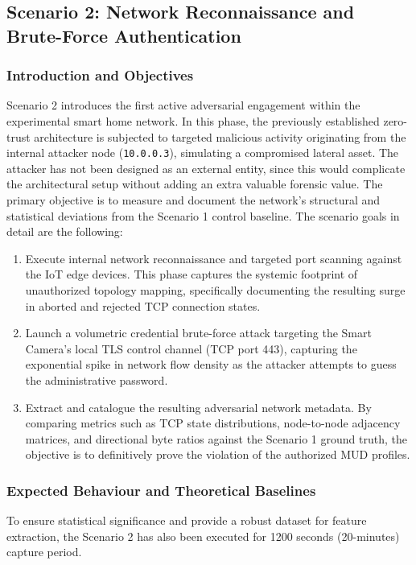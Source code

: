 \subsection{Scenario 2: Network Reconnaissance and Brute-Force Authentication}
\subsubsection{Introduction and Objectives}
Scenario 2 introduces the first active adversarial engagement within the experimental smart home network. In this phase, the previously established zero-trust architecture is subjected to targeted malicious activity originating from the internal attacker node (\texttt{10.0.0.3}), simulating a compromised lateral asset. The attacker has not been designed as an external entity, since this would complicate the architectural setup without adding an extra valuable forensic value. The primary objective is to measure and document the network's structural and statistical deviations from the Scenario 1 control baseline. The scenario goals in detail are the following:

\begin{enumerate}
	\item Execute internal network reconnaissance and targeted port scanning against the IoT edge devices. This phase captures the systemic footprint of unauthorized topology mapping, specifically documenting the resulting surge in aborted and rejected TCP connection states.
	\item Launch a volumetric credential brute-force attack targeting the Smart Camera's local TLS control channel (TCP port 443), capturing the exponential spike in network flow density as the attacker attempts to guess the administrative password.
	\item Extract and catalogue the resulting adversarial network metadata. By comparing metrics such as TCP state distributions, node-to-node adjacency matrices, and directional byte ratios against the Scenario 1 ground truth, the objective is to definitively prove the violation of the authorized MUD profiles.
\end{enumerate}


\subsubsection{Expected Behaviour and Theoretical Baselines}

To ensure statistical significance and provide a robust dataset for feature extraction, the Scenario 2 has also been executed for 1200 seconds (20-minutes) capture period. 

